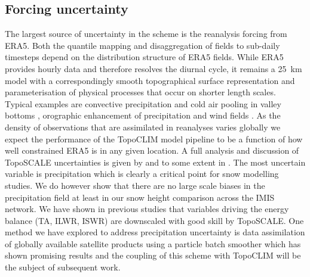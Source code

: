 \documentclass[hess, manuscript]{copernicus}
\begin{document}



\subsection{Forcing uncertainty}
The largest source of uncertainty in the scheme is the reanalysis forcing from ERA5. Both the quantile mapping and disaggregation of fields to sub-daily timesteps depend on the distribution structure of ERA5 fields. While ERA5 provides hourly data and therefore resolves the diurnal cycle, it remains a 25~km model with a correspondingly smooth topographical surface representation and parameterisation of physical processes that occur on shorter length scales. Typical examples are convective precipitation and cold air pooling in valley bottoms \citep{Cao2017-ce, Liu2017-md}, orographic enhancement of precipitation and wind fields \citep{Gerber2018-ym, Mott2018-pt, Gutmann2016-bs}. As the density of observations that are assimilated in reanalyses varies globally we expect the performance of the TopoCLIM model pipeline to be a function of how well constrained ERA5 is in any given location. A full analysis and discussion of TopoSCALE uncertainties is given by \cite{Fiddes2014-wt} and to some extent in \cite{Fiddes2019-vy}. The most uncertain variable is precipitation which is clearly a critical point for snow modelling studies. We do however show that there are no large scale biases in the precipitation field at least in our snow height comparison across the IMIS network.  We have shown in previous studies that variables driving the energy balance (TA, ILWR, ISWR) are downscaled with good skill by TopoSCALE. One method we have explored to address precipitation uncertainty is data assimilation of globally available satellite products using a particle batch smoother which has shown promising results \citep{Fiddes2019-vy} and the coupling of this scheme with TopoCLIM will be the subject of subsequent work.
\end{document}
